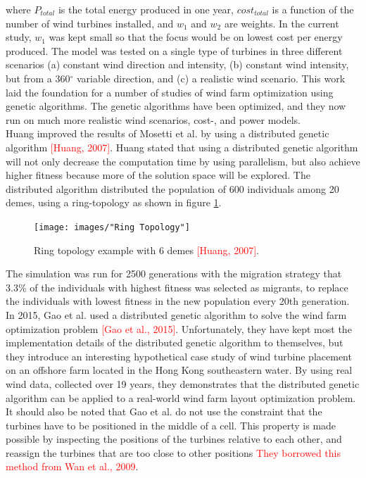 where $P_{total}$ is the total energy produced in one year, $cost_{total}$ is a function of the number of wind turbines installed, and $w_1$ and $w_2$ are weights. In the current study, $w_1$ was kept small so that the focus would be on lowest cost per energy produced. The model was tested on a single type of turbines in three different scenarios (a) constant wind direction and intensity, (b) constant wind intensity, but from a 360$^{\circ}$ variable direction, and (c) a realistic wind scenario. This work laid the foundation for a number of studies of wind farm optimization using genetic algorithms. The genetic algorithms have been optimized, and they now run on much more realistic wind scenarios, cost-, and power models.\\

\noindent Huang improved the results of Mosetti et al. by using a distributed genetic algorithm \textcolor{red}{[Huang, 2007]}. Huang stated that using a distributed genetic algorithm will not only decrease the computation time by using parallelism, but also achieve higher fitness because more of the solution space will be explored. The distributed algorithm distributed the population of 600 individuals among 20 demes, using a ring-topology as shown in figure \ref{Ring Topology}.

\begin{figure}[h!]
\begin{center}
\texttt{[image: images/"Ring Topology"]}
\caption{Ring topology example with 6 demes \textcolor{red}{[Huang, 2007]}.}
\label{Ring Topology}
\end{center}
\end{figure}


The simulation was run for 2500 generations with the migration strategy that 3.3\% of the individuals with highest fitness was selected as migrants, to replace the individuals with lowest fitness in the new population every 20th generation. \\

\noindent In 2015, Gao et al. used a distributed genetic algorithm to solve the wind farm optimization problem \textcolor{red}{[Gao et al., 2015]}. Unfortunately, they have kept most the implementation details of the distributed genetic algorithm to themselves, but they introduce an interesting hypothetical case study of wind turbine placement on an offshore farm located in the Hong Kong southeastern water. By using real wind data, collected over 19 years, they demonstrates that the distributed genetic algorithm can be applied to a real-world wind farm layout optimization problem. It should also be noted that Gao et al. do not use the constraint that the turbines have to be positioned in the middle of a cell. This property is made possible by inspecting the positions of the turbines relative to each other, and reassign the turbines that are too close to other positions \textcolor{red}{They borrowed this method from Wan et al., 2009}.\\

